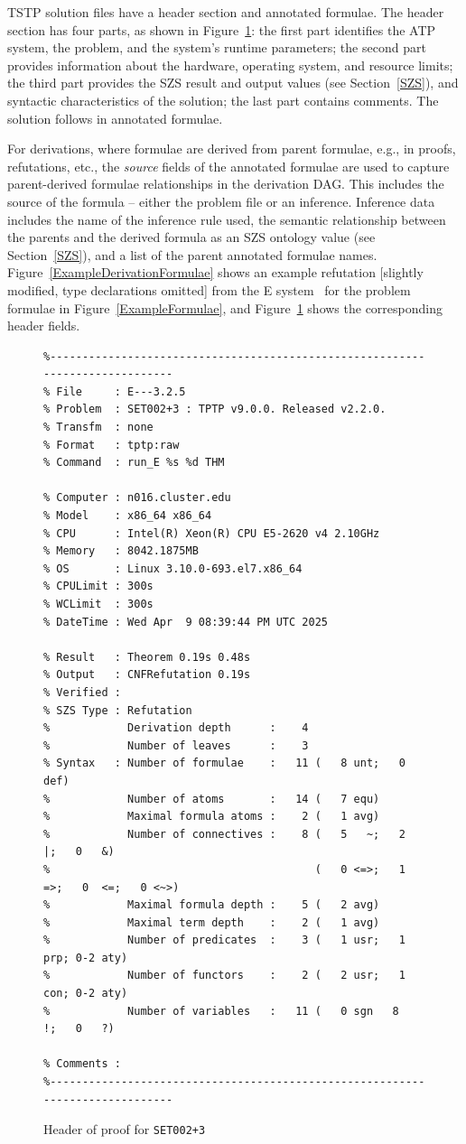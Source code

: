 \documentclass[runningheads]{llncs}
\begin{document}
TSTP solution files have a header section and annotated formulae.
The header section has four parts, as shown in Figure~\ref{ExampleDerivationHeader}:
the first part identifies the ATP system, the problem, and the system's runtime parameters; 
the second part provides information about the hardware, operating system, and resource limits; 
the third part provides the SZS result and output values (see Section~\ref{SZS}), and syntactic 
characteristics of the solution; the last part contains comments.
The solution follows in annotated formulae.

For derivations, where formulae are derived from parent formulae, e.g., in proofs, refutations, 
etc., the {\em source} fields of the annotated formulae are used to capture parent-derived 
formulae relationships in the derivation DAG.
This includes the source of the formula -- either the problem file or an inference.
Inference data includes the name of the inference rule used, the semantic relationship between 
the parents and the derived formula as an SZS ontology value (see Section~\ref{SZS}), and a 
list of the parent annotated formulae names.
Figure~\ref{ExampleDerivationFormulae} shows an example refutation [slightly modified, type
declarations omitted] from the E system~\cite{SCV19} for the problem formulae in 
Figure~\ref{ExampleFormulae}, and Figure~\ref{ExampleDerivationHeader} shows the corresponding 
header fields.

\begin{figure}[htb]
\centering
{\scriptsize
{\setlength{\baselineskip}{2.5mm}
\begin{verbatim}
%------------------------------------------------------------------------------
% File     : E---3.2.5
% Problem  : SET002+3 : TPTP v9.0.0. Released v2.2.0.
% Transfm  : none
% Format   : tptp:raw
% Command  : run_E %s %d THM

% Computer : n016.cluster.edu
% Model    : x86_64 x86_64
% CPU      : Intel(R) Xeon(R) CPU E5-2620 v4 2.10GHz
% Memory   : 8042.1875MB
% OS       : Linux 3.10.0-693.el7.x86_64
% CPULimit : 300s
% WCLimit  : 300s
% DateTime : Wed Apr  9 08:39:44 PM UTC 2025

% Result   : Theorem 0.19s 0.48s
% Output   : CNFRefutation 0.19s
% Verified : 
% SZS Type : Refutation
%            Derivation depth      :    4
%            Number of leaves      :    3
% Syntax   : Number of formulae    :   11 (   8 unt;   0 def)
%            Number of atoms       :   14 (   7 equ)
%            Maximal formula atoms :    2 (   1 avg)
%            Number of connectives :    8 (   5   ~;   2   |;   0   &)
%                                         (   0 <=>;   1  =>;   0  <=;   0 <~>)
%            Maximal formula depth :    5 (   2 avg)
%            Maximal term depth    :    2 (   1 avg)
%            Number of predicates  :    3 (   1 usr;   1 prp; 0-2 aty)
%            Number of functors    :    2 (   2 usr;   1 con; 0-2 aty)
%            Number of variables   :   11 (   0 sgn   8   !;   0   ?)

% Comments : 
%------------------------------------------------------------------------------
\end{verbatim}
}}
\caption{Header of proof for {\tt SET002+3}}
\label{ExampleDerivationHeader}
\end{figure}
\end{document}
